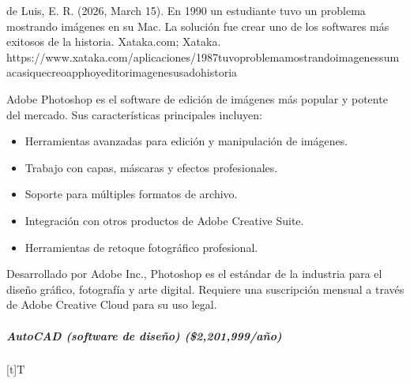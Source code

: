 \documentclass[letterpaper,10pt,spanish]{sphinxmanual}
\let\sphinxpxdimen\pdfpxdimen\else\newdimen\sphinxpxdimen
\begin{document}
\sphinxAtStartPar
%
\begin{footnote}[13]\sphinxAtStartFootnote
de Luis, E. R. (2026, March 15). En 1990 un estudiante tuvo un problema mostrando imágenes en su Mac. La solución fue crear uno de los softwares más exitosos de la historia. Xataka.com; Xataka. https://www.xataka.com/aplicaciones/1987\sphinxhyphen{}tuvo\sphinxhyphen{}problema\sphinxhyphen{}mostrando\sphinxhyphen{}imagenes\sphinxhyphen{}su\sphinxhyphen{}mac\sphinxhyphen{}asi\sphinxhyphen{}que\sphinxhyphen{}creo\sphinxhyphen{}app\sphinxhyphen{}hoy\sphinxhyphen{}editor\sphinxhyphen{}imagenes\sphinxhyphen{}usado\sphinxhyphen{}historia
%
\end{footnote} Adobe Photoshop es el software de edición de imágenes más popular y potente del mercado. Sus características principales incluyen:
\begin{itemize}
\item {} 
\sphinxAtStartPar
Herramientas avanzadas para edición y manipulación de imágenes.

\item {} 
\sphinxAtStartPar
Trabajo con capas, máscaras y efectos profesionales.

\item {} 
\sphinxAtStartPar
Soporte para múltiples formatos de archivo.

\item {} 
\sphinxAtStartPar
Integración con otros productos de Adobe Creative Suite.

\item {} 
\sphinxAtStartPar
Herramientas de retoque fotográfico profesional.

\end{itemize}

\sphinxAtStartPar
Desarrollado por Adobe Inc., Photoshop es el estándar de la industria para el diseño gráfico, fotografía y arte digital. Requiere una suscripción mensual a través de Adobe Creative Cloud para su uso legal.


\subparagraph{AutoCAD (software de diseño) (\$2,201,999/año)}
\label{\detokenize{cursos/ofimatica10/recursos/T02:autocad-software-de-diseno-2-201-999-ano}}

\begin{savenotes}\sphinxattablestart
\sphinxthistablewithglobalstyle
\centering
\begin{tabulary}{\linewidth}[t]{T}
\sphinxtoprule
\sphinxtableatstartofbodyhook

\begin{sphinxfigure-in-table}
\centering
\capstart
\noindent\sphinxincludegraphics[width=360\sphinxpxdimen]{{image14}.png}
\label{\detokenize{cursos/ofimatica10/recursos/T02:id46}}\end{sphinxfigure-in-table}\relax
\\
\sphinxbottomrule
\end{tabulary}
\sphinxtableafterendhook\par
\sphinxattableend\end{savenotes}
\end{document}
